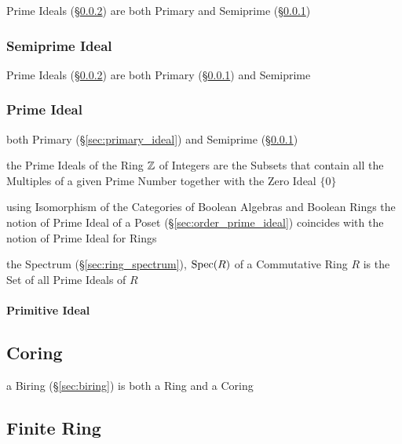 Prime Ideals (\S\ref{sec:prime_ideal}) are both Primary and Semiprime
(\S\ref{sec:semiprime_ideal})



\subsubsection{Semiprime Ideal}\label{sec:semiprime_ideal}

Prime Ideals (\S\ref{sec:prime_ideal}) are both Primary
(\S\ref{sec:semiprime_ideal}) and Semiprime



\subsubsection{Prime Ideal}\label{sec:prime_ideal}

both Primary (\S\ref{sec:primary_ideal}) and Semiprime
(\S\ref{sec:semiprime_ideal})

the Prime Ideals of the Ring $\mathbb{Z}$ of Integers are the Subsets that contain
all the Multiples of a given Prime Number together with the Zero Ideal $\{0\}$

\fist using Isomorphism of the Categories of Boolean Algebras and Boolean Rings
the notion of Prime Ideal of a Poset (\S\ref{sec:order_prime_ideal}) coincides
with the notion of Prime Ideal for Rings

the Spectrum (\S\ref{sec:ring_spectrum}), $\mathrm{Spec}(R)$ of a Commutative Ring $R$
is the Set of all Prime Ideals of $R$



\paragraph{Primitive Ideal}\label{sec:primitive_ideal}\hfill



\subsection{Coring}\label{sec:coring}

a Biring (\S\ref{sec:biring}) is both a Ring and a Coring



\subsection{Finite Ring}\label{sec:finite_ring}

